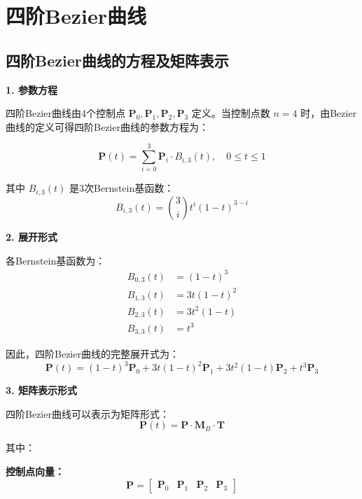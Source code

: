 \documentclass[12pt,a4paper]{article}
\begin{document}
\section{四阶Bezier曲线}

\subsection{四阶Bezier曲线的方程及矩阵表示}

\begin{tcolorbox}[breakable]
\textbf{1. 参数方程}

四阶Bezier曲线由4个控制点 $\mathbf{P}_0, \mathbf{P}_1, \mathbf{P}_2, \mathbf{P}_3$ 定义。当控制点数 $n=4$ 时，由Bezier曲线的定义可得四阶Bezier曲线的参数方程为：

\begin{equation}
\mathbf{P}(t) = \sum_{i=0}^{3} \mathbf{P}_i \cdot B_{i,3}(t), \quad 0 \leq t \leq 1
\end{equation}

其中 $B_{i,3}(t)$ 是3次Bernstein基函数：
\begin{equation}
B_{i,3}(t) = \binom{3}{i} t^i (1-t)^{3-i}
\end{equation}

\textbf{2. 展开形式}

各Bernstein基函数为：
\begin{align}
B_{0,3}(t) &= (1-t)^3 \\
B_{1,3}(t) &= 3t(1-t)^2 \\
B_{2,3}(t) &= 3t^2(1-t) \\
B_{3,3}(t) &= t^3
\end{align}

因此，四阶Bezier曲线的完整展开式为：
\begin{equation}
\mathbf{P}(t) = (1-t)^3 \mathbf{P}_0 + 3t(1-t)^2 \mathbf{P}_1 + 3t^2(1-t) \mathbf{P}_2 + t^3 \mathbf{P}_3
\end{equation}

\textbf{3. 矩阵表示形式}

四阶Bezier曲线可以表示为矩阵形式：
\begin{equation}
\mathbf{P}(t) = \mathbf{P} \cdot \mathbf{M}_B \cdot \mathbf{T}
\end{equation}

其中：

\textbf{控制点向量：}
\begin{equation}
\mathbf{P} = \begin{bmatrix} \mathbf{P}_0 & \mathbf{P}_1 & \mathbf{P}_2 & \mathbf{P}_3 \end{bmatrix}
\end{equation}


\end{tcolorbox}
\end{document}
